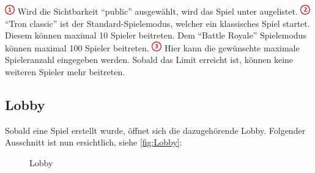 \documentclass[11pt,ngerman]{article}
\newcommand{\quotes}[1]{``#1''}
\begin{document}
    \noindent \includegraphics{figures/1.png} Wird die Sichtbarkeit \quotes{public} ausgewählt, wird das Spiel unter  augelistet. \newline
    \newline
    \noindent \includegraphics{figures/2.png} \quotes{Tron classic} ist der Standard-Spielemodus, welcher ein klassisches Spiel startet. Diesem können maximal 10 Spieler beitreten. \newline
    Dem \quotes{Battle Royale} Spielemodus können maximal 100 Spieler beitreten.\newline
    \newline
    \noindent \includegraphics{figures/3.png} Hier kann die gewünschte maximale Spieleranzahl eingegeben werden. Sobald das Limit erreicht ist, können keine weiteren Spieler mehr beitreten.

    \subsection{Lobby}

    Sobald eine Spiel erstellt wurde, öffnet sich die dazugehörende Lobby. Folgender Ausschnitt ist nun ersichtlich, siehe \autoref{fig:Lobby}:
    \begin{figure}[H]
    	\centering
    	\caption{Lobby}
    	\label{fig:Lobby}
    \end{figure}
\end{document}

